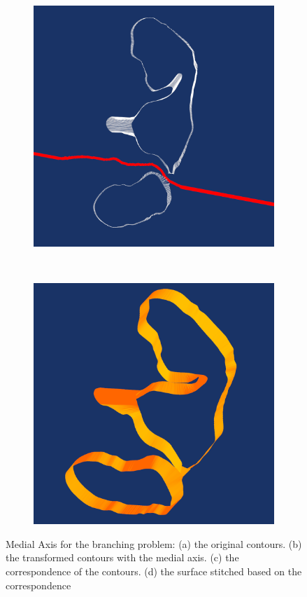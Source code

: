 \documentclass[3p,times]{elsarticle}
\begin{document}
\begin{figure}[ht]
\begin{subfigure}[b]{0.25\textwidth}
\includegraphics[width=\textwidth]{../picture/Medial_correspond_20_21.png}
\caption{}
\label{fig:Medial_correspond_20_21}
\end{subfigure}
~~~~~~~~~~~~~~~~~~~~~~~~~~~~~~~~~~~~
\begin{subfigure}[b]{0.25\textwidth}
\includegraphics[width=\textwidth]{../picture/Medial_surface_20_21.png}
\caption{}
\label{fig:Medial_surface_20_21}
\end{subfigure}
\caption{Medial Axis for the branching problem: (a) the original
  contours. (b) the transformed contours with the medial axis. (c) the
correspondence of the contours. (d) the surface stitched based on the
correspondence}

\end{figure}
\end{document}
